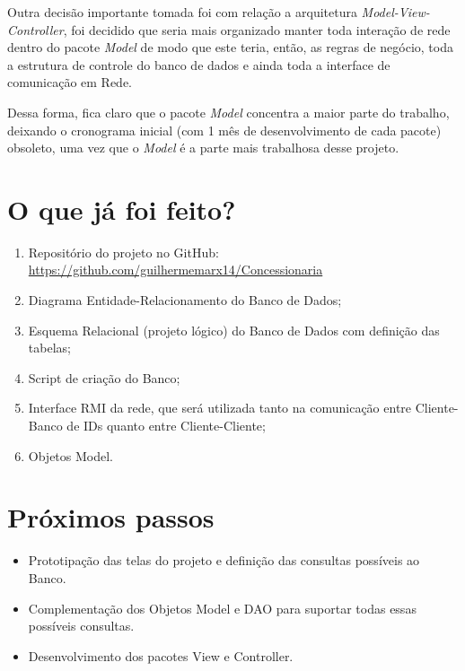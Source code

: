 \documentclass[brazil, a4paper,12pt]{article}
\begin{document}
Outra decisão importante tomada foi com relação a arquitetura \emph{Model-View-Controller}, foi decidido que seria mais organizado manter toda interação de rede dentro do pacote \emph{Model} de modo que este teria, então, as regras de negócio, toda a estrutura de controle do banco de dados e ainda toda a interface de comunicação em Rede. 

Dessa forma, fica claro que o pacote \emph{Model} concentra a maior parte do trabalho, deixando o cronograma inicial (com 1 mês de desenvolvimento de cada pacote) obsoleto, uma vez que o \emph{Model} é a parte mais trabalhosa desse projeto.


\section{O que já foi feito?}
\begin{enumerate}
	\item Repositório do projeto no GitHub: \url{https://github.com/guilhermemarx14/Concessionaria}
	\item Diagrama Entidade-Relacionamento do Banco de Dados;
	\item Esquema Relacional (projeto lógico) do Banco de Dados com definição das tabelas;
	\item Script de criação do Banco;
	\item Interface RMI da rede, que será utilizada tanto na comunicação entre Cliente-Banco de IDs quanto entre Cliente-Cliente;
	\item Objetos Model.
\end{enumerate}

\section{Próximos passos}
\begin{itemize}
	\item Prototipação das telas do projeto e definição das consultas possíveis ao Banco.
	\item Complementação dos Objetos Model e DAO para suportar todas essas possíveis consultas.
	\item Desenvolvimento dos pacotes View e Controller.
\end{itemize}
\end{document}
